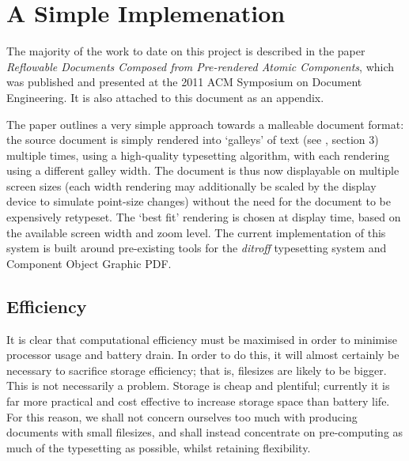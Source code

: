 \chapter{A Simple Implemenation}\label{ch:paper}


The majority of the work to date on this project is described in the paper \emph{Reflowable
Documents Composed from Pre-rendered Atomic Components}\cite{Pinkney2011}, which was published and
presented at the 2011 ACM Symposium on Document Engineering. It is also attached to this document as
an appendix.

The paper outlines a very simple approach towards a malleable document format: the source document
is simply rendered into `galleys' of text (see \cite{Pinkney2011}, section 3) multiple times, using
a high-quality typesetting algorithm, with each rendering using a different galley width. The
document is thus now displayable on multiple screen sizes (each width rendering may additionally be
scaled by the display device to simulate point-size changes) without the need for the document to be
expensively retypeset. The `best fit' rendering is chosen at display time, based on the available
screen width and zoom level. The current implementation of this system is built around pre-existing
tools for the \emph{ditroff} typesetting system\cite{Kernighan1982} and Component Object Graphic
PDF\cite{Bagley2003}.

\section{Efficiency}
It is clear that computational efficiency must be maximised in order to minimise processor usage and
battery drain. In order to do this, it will almost certainly be necessary to sacrifice storage
efficiency; that is, filesizes are likely to be bigger. This is not necessarily a problem. Storage
is cheap and plentiful; currently it is far more practical and cost effective to increase storage
space than battery life. For this reason, we shall not concern ourselves too much with producing
documents with small filesizes, and shall instead concentrate on pre-computing as much of the
typesetting as possible, whilst retaining flexibility.

